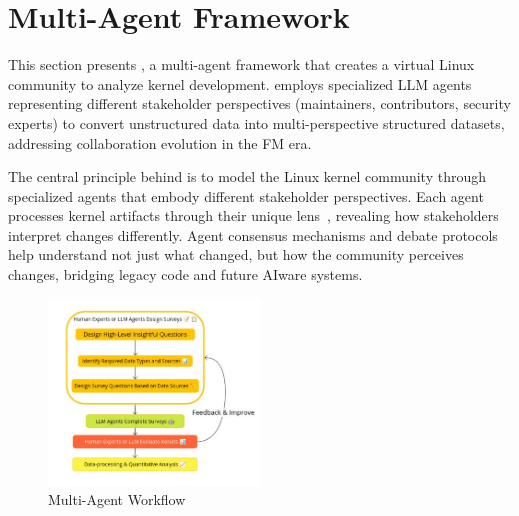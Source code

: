 \section{\sys Multi-Agent Framework}
\label{sec:methodology}

This section presents \sys, a multi-agent framework that creates a virtual Linux community to analyze kernel development. \sys employs specialized LLM agents representing different stakeholder perspectives (maintainers, contributors, security experts) to convert unstructured data into multi-perspective structured datasets, addressing collaboration evolution in the FM era.

The central principle behind \sys is to model the Linux kernel community through specialized agents that embody different stakeholder perspectives. Each agent processes kernel artifacts through their unique lens~\cite{ji2023survey}, revealing how stakeholders interpret changes differently. Agent consensus mechanisms and debate protocols help understand not just what changed, but how the community perceives changes, bridging legacy code and future AIware systems.

\begin{figure}[t]
    \centering
    \includegraphics[width=0.5\textwidth]{workflow.pdf}
    \caption{\sys Multi-Agent Workflow}
    \label{fig:workflow}
\end{figure}

